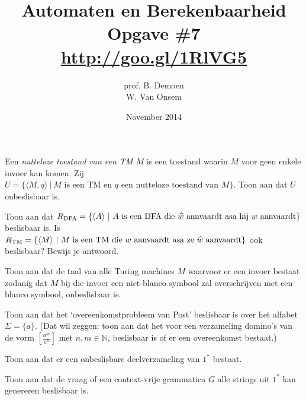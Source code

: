 \documentclass[a4paper]{article}
\title{Automaten en Berekenbaarheid\\Opgave \#7\\\url{http://goo.gl/1RlVG5}}
\author{prof. B. Demoen\\W. Van Onsem}
\date{November 2014}
\begin{document}
\maketitle

\begin{question}
Een \emph{nutteloze toestand van een TM $M$} is een toestand waarin $M$ voor geen enkele invoer kan komen. Zij $U = \{ \langle M, q \rangle \ | \ \text{$M$ is een TM en $q$ een nutteloze toestand van $M$} \}$. Toon aan dat $U$ onbeslisbaar is.
\end{question}

\begin{question}
Toon aan dat $R_{\rm DFA} = \{ \langle A \rangle \ | \ \text{$A$ is een DFA die $\widehat{w}$ aanvaardt asa hij $w$ aanvaardt} \}$ beslisbaar is. Is $R_{\rm TM} = \{ \langle M \rangle \ | \ \text{$M$ is een TM die $w$ aanvaardt asa ze $\widehat{w}$ aanvaardt} \}$ ook beslisbaar? Bewijs je antwoord.
\end{question}

\begin{question}
Toon aan dat de taal van alle Turing machines $M$ waarvoor er een invoer bestaat zodanig dat $M$ bij die invoer een niet-blanco symbool zal overschrijven met een blanco symbool, onbeslisbaar is.
\end{question}

\begin{question}
Toon aan dat het `overeenkomstprobleem van Post' beslisbaar is over het alfabet $\Sigma = \{ a \}$. (Dat wil zeggen: toon aan dat het voor een verzameling domino's van de vorm $\left[ \frac{a^m}{a^n} \right]$ met $n,m \in \mathbb{N}$, beslisbaar is of er een overeenkomst bestaat.) 
\end{question}

\begin{question}
Toon aan dat er een onbeslisbare deelverzameling van $1^*$ bestaat.
\end{question}

\begin{question}
Toon aan dat de vraag of een context-vrije grammatica $G$ alle strings uit $1^*$ kan genereren beslisbaar is.
\end{question}
\end{document}
